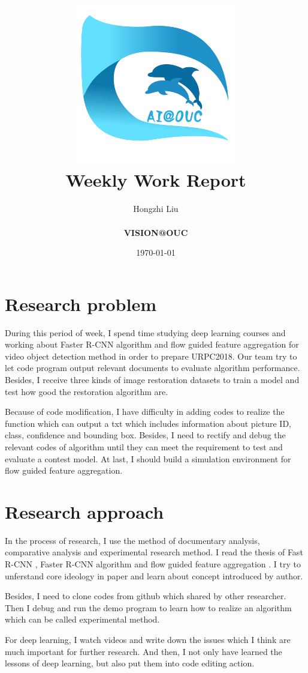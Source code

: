 \documentclass[a4paper]{article}
\title{
    \vspace*{1in}
    \includegraphics[width=2.75in]{figures/zhenglab-logo} \\
    \vspace*{1.2in}
    \textbf{\huge Weekly Work Report}
    \vspace{0.2in}
}
\author{Hongzhi Liu \\
    \vspace*{0.5in} \\
    \textbf{VISION@OUC} \\
    \vspace*{1in}
}
\date{\today}
\begin{document}
\par
\maketitle
\setcounter{page}{0}
\thispagestyle{empty}

\newpage

\section{Research problem}

During this period of week, I spend time studying deep learning courses and working about Faster R-CNN algorithm and flow guided feature aggregation for video object detection method in order to prepare URPC2018. Our team try to let code program output relevant documents to evaluate algorithm performance. Besides, I receive three kinds of image restoration datasets to train a model and test how good the restoration algorithm are.

Because of code modification, I have difficulty in adding codes to realize the function which can output a txt which includes information about picture ID, class, confidence and bounding box. Besides, I need to rectify and debug the relevant codes of algorithm until they can meet the requirement to test and evaluate a contest model. At last, I should build a simulation environment for flow guided feature aggregation. 

\section{Research approach}

In the process of research, I use the method of documentary analysis, comparative analysis and experimental research method. I read the thesis of Fast R-CNN \cite{Girshick2015Fast}, Faster R-CNN algorithm \cite{Ren2015Faster} and flow guided feature aggregation \cite{zhu17fgfa}. I try to unferstand core ideology in paper and learn about concept introduced by author.

Besides, I need to clone codes from github which shared by other researcher. Then I debug and run the demo program to learn how to realize an algorithm which can be called experimental method. 

For deep learning, I watch videos and write down the issues which I think are much important for further research. And then, I not only have learned the lessons of deep learning, but also put them into code editing action. 
\end{document}
